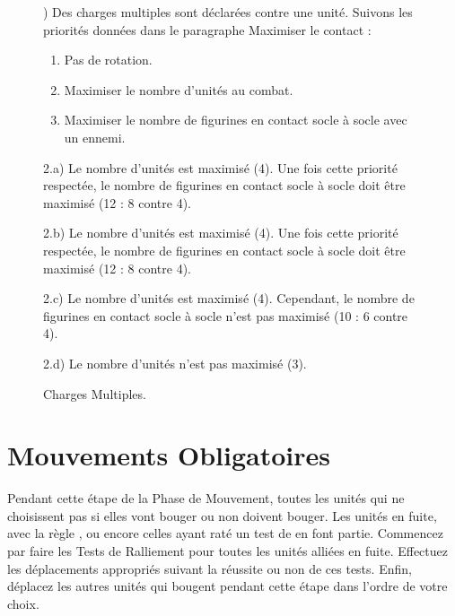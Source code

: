 \begin{figure}[!htbp]
\begin{minipage}{0.5\textwidth}
\def\svgwidth{\textwidth}

\end{minipage}\hfill\begin{minipage}{0.47\textwidth}
\caption{Charges Multiples.}
\label{figure/multiplecharges}

\vspace*{10pt}
) Des charges multiples sont déclarées contre une unité. Suivons les priorités données dans le paragraphe Maximiser le contact :
\begin{enumerate}
\item Pas de rotation.
\item Maximiser le nombre d'unités au combat.
\item Maximiser le nombre de figurines en contact socle à socle avec un ennemi.
\end{enumerate}

\vspace*{10pt}
\noindent 2.a) Le nombre d'unités est maximisé (4). Une fois cette priorité respectée, le nombre de figurines en contact socle à socle doit être maximisé (12 : 8 contre 4).

\vspace*{10pt}
\noindent 2.b) Le nombre d'unités est maximisé (4). Une fois cette priorité respectée, le nombre de figurines en contact socle à socle doit être maximisé (12 : 8 contre 4).

\vspace*{10pt}
\noindent 2.c) Le nombre d'unités est maximisé (4). Cependant, le nombre de figurines en contact socle à socle n'est pas maximisé (10 : 6 contre 4).

\vspace*{10pt}
\noindent 2.d) Le nombre d'unités n'est pas maximisé (3).
\end{minipage}
\end{figure}

\newpage
\hypertarget{compulsorymoves}{\section{Mouvements Obligatoires}}

Pendant cette étape de la Phase de Mouvement, toutes les unités qui ne choisissent pas si elles vont bouger ou non doivent bouger. Les unités en fuite, avec la règle \randommovement{}, ou encore celles ayant raté un test de \stupidity{} en font partie. Commencez par faire les Tests de Ralliement pour toutes les unités alliées en fuite. Effectuez les déplacements appropriés suivant la réussite ou non de ces tests. Enfin, déplacez les autres unités qui bougent pendant cette étape dans l'ordre de votre choix.

